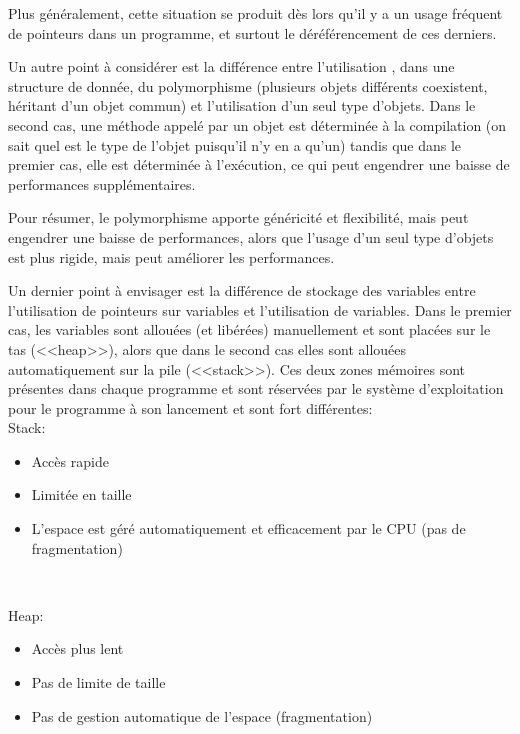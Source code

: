 \documentclass[a4paper,french,12pt]{article}
\begin{document}
\begin{description}
	      Plus généralement, cette situation se produit dès lors qu'il y a un usage fréquent de pointeurs dans un 
	      programme, et surtout le déréférencement de ces derniers.
	      
	      Un autre point à considérer est la différence entre l'utilisation , dans une structure de donnée, du polymorphisme (plusieurs objets
	      différents coexistent, héritant d'un objet commun) et l'utilisation d'un seul type d'objets.
	      Dans le second cas, une méthode appelé par un objet est déterminée à la compilation (on sait quel est le type
	      de l'objet puisqu'il n'y en a qu'un) tandis que dans le premier cas, elle est déterminée à l'exécution,
	      ce qui peut engendrer une baisse de performances supplémentaires.
	      
	      Pour résumer, le polymorphisme apporte généricité et flexibilité, mais peut engendrer une baisse de 
	      performances, alors que l'usage d'un seul type d'objets est plus rigide, mais peut améliorer les performances.
	      
	      Un dernier point à envisager est la différence de stockage des variables entre l'utilisation de pointeurs sur variables
	      et l'utilisation de variables. Dans le premier cas, les variables sont allouées (et libérées) manuellement et sont placées sur
	      le tas (<<heap>>), alors que dans le second cas elles sont allouées automatiquement sur la pile (<<stack>>).
	      Ces deux zones mémoires sont présentes dans chaque programme et sont réservées par le système d'exploitation
	      pour le programme à son lancement et sont fort différentes:\\
	      
	      Stack:
	      \begin{itemize}
		\item Accès rapide
		\item Limitée en taille
		\item L'espace est géré automatiquement et efficacement par le CPU (pas de fragmentation)
	      \end{itemize}~
	      
	      Heap:
	      \begin{itemize}
		\item Accès plus lent
		\item Pas de limite de taille
		\item Pas de gestion automatique de l'espace (fragmentation)
	      \end{itemize}~
	      

\end{description}
\end{document}
